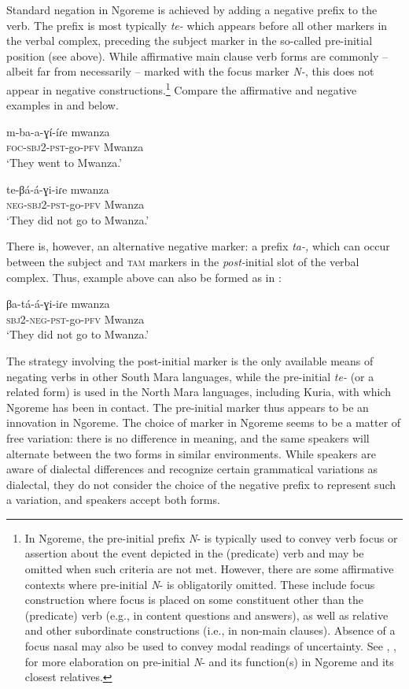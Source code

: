 \documentclass[output=paper,colorlinks,citecolor=brown,draftmode]{langscibook}
\begin{document}
Standard negation in Ngoreme is achieved by adding a negative prefix to the verb. The prefix is most typically \textit{te-} which appears before all other markers in the verbal complex, preceding the subject marker in the so-called pre-initial position (see  above). While affirmative main clause verb forms are commonly – albeit far from necessarily – marked with the focus marker \textit{N-}, this does not appear in negative constructions.\footnote{In Ngoreme, the pre-initial prefix \textit{N}{}- is typically used to convey verb focus or assertion about the event depicted in the (predicate) verb and may be omitted when such criteria are not met. However, there are some affirmative contexts where pre-initial \textit{N}{}- is obligatorily omitted. These include focus construction where focus is placed on some constituent other than the (predicate) verb (e.g., in content questions and answers), as well as relative and other subordinate constructions (i.e., in non-main clauses). Absence of a focus nasal may also be used to convey modal readings of uncertainty. See \citet{AunioEtAl2019}, \citet[35--36]{Roth2018}, \citet{BernanderLaine2020} for more elaboration on pre-initial \textit{N}{}- and its function(s) in Ngoreme and its closest relatives.} Compare the affirmative and negative examples in  and  below. 

\ea\label{ex:ngo:3} 
    \gll m-ba-a-ɣí-íɾe mwanza \\ 
        \textsc{foc-sbj2{}-pst}{}-go-\textsc{pfv} Mwanza\\
    \glt ‘They went to Mwanza.’
\z 

\ea\label{ex:ngo:4} 
    \gll te-βá-á-ɣi-iɾe mwanza \\ 
     \textsc{neg-sbj2-pst}{}-go-\textsc{pfv} Mwanza\\
    \glt ‘They did not go to Mwanza.’
\z 

There is, however, an alternative negative marker: a prefix \textit{ta-,} which can occur between the subject and \textsc{tam} markers in the \textit{post-}initial slot of the verbal complex. Thus, example  above can also be formed as in :

\ea\label{ex:ngo:5} 
    \gll βa-tá-á-ɣi-iɾe mwanza \\ 
         \textsc{sbj2-neg{}-pst}{}-go-\textsc{pfv} Mwanza\\
     \glt ‘They did not go to Mwanza.’
\z 
 

The strategy involving the post-initial marker is the only available means of negating verbs in other South Mara languages, while the pre-initial \textit{te-} (or a related form) is used in the North Mara languages, including Kuria, with which Ngoreme has been in contact. The pre-initial marker thus appears to be an innovation in Ngoreme. The choice of marker in Ngoreme seems to be a matter of free variation: there is no difference in meaning, and the same speakers will alternate between the two forms in similar environments. While speakers are aware of dialectal differences and recognize certain grammatical variations as dialectal, they do not consider the choice of the negative prefix to represent such a variation, and speakers accept both forms.
\end{document}
